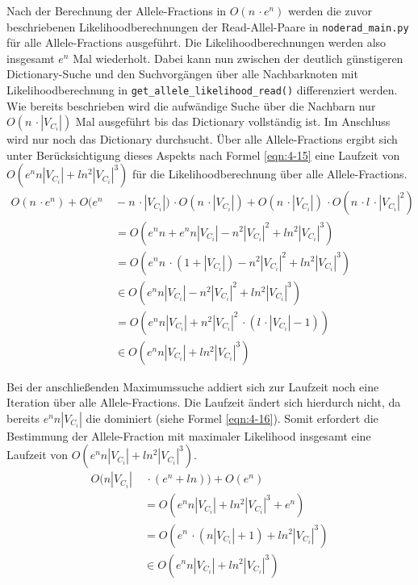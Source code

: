 Nach der Berechnung der Allele-Fractions in $O(n \, \cdotp e^n)$ werden die zuvor beschriebenen Likelihoodberechnungen der Read-Allel-Paare in \lstinline|noderad_main.py| für alle Allele-Fractions ausgeführt. Die Likelihoodberechnungen werden also insgesamt $ e^n $ Mal wiederholt. Dabei kann nun zwischen der deutlich günstigeren Dictionary-Suche und den Suchvorgängen über alle Nachbarknoten mit Likelihoodberechnung in \lstinline|get_allele_likelihood_read()| differenziert werden. Wie bereits beschrieben wird die aufwändige Suche über die Nachbarn nur $ O(n \,\cdotp |V_{C_{i}}|) $ Mal ausgeführt bis das Dictionary vollständig ist. Im Anschluss wird nur noch das Dictionary durchsucht. Über alle Allele-Fractions ergibt sich unter Berücksichtigung dieses Aspekts nach Formel \eqref{eqn:4-15} eine Laufzeit von $ O( e^n n |V_{C_{i}}| + l n^2 |V_{C_{i}}|^3) $ für die Likelihoodberechnung über alle Allele-Fractions.
\begin{equation} \label{eqn:4-15}
\tag{4-15}
\begin{aligned}
O(n \, \cdotp e^n) + O(e^n &\ {} - n \,\cdotp |V_{C_{i}}|) \,  \cdotp O(n \,\cdotp |V_{C_{i}}|) + O(n \,\cdotp |V_{C_{i}}|) \, \cdotp O(n \,\cdotp l \,\cdotp |V_{C_{i}}|^2)\\
&\ = O(e^nn + e^n n |V_{C_{i}}| - n^2 |V_{C_{i}}|^2 + l n^2 |V_{C_{i}}|^3)\\
&\ = O(e^nn \, \cdotp(1 + |V_{C_{i}}|) - n^2 |V_{C_{i}}|^2 + l n^2 |V_{C_{i}}|^3)\\
&\ \in O(e^nn |V_{C_{i}}| - n^2 |V_{C_{i}}|^2 + l n^2 |V_{C_{i}}|^3)\\
&\ = O( e^n n |V_{C_{i}}| + n^2 |V_{C_{i}}|^2 \,\cdotp (l \,\cdotp|V_{C_{i}}| - 1))\\
&\ \in O( e^n n |V_{C_{i}}| + l n^2 |V_{C_{i}}|^3) 
\end{aligned}
\end{equation}

Bei der anschließenden Maximumssuche addiert sich zur Laufzeit noch eine Iteration über alle Allele-Fractions. Die Laufzeit ändert sich hierdurch nicht, da bereits $e^n n |V_{C_{i}}|$ die dominiert (siehe Formel \eqref{eqn:4-16}). Somit erfordert die Bestimmung der Allele-Fraction mit maximaler Likelihood insgesamt eine Laufzeit von $ O( e^n n |V_{C_{i}}| + l n^2 |V_{C_{i}}|^3) $.
\begin{equation} \label{eqn:4-16}
\tag{4-16}
\begin{aligned}
 O( n |V_{C_{i}}| &\ {} \,\cdotp (e^n + ln)) + O(e^n) \\
&\ = O( e^n n |V_{C_{i}}| + l n^2 |V_{C_{i}}|^3 + e^n)\\
&\ = O( e^n \,\cdotp ( n |V_{C_{i}}| + 1) + l n^2 |V_{C_{i}}|^3) \\
& \ \in O( e^n n |V_{C_{i}}| + l n^2 |V_{C_{i}}|^3) 
\end{aligned}
\end{equation}

